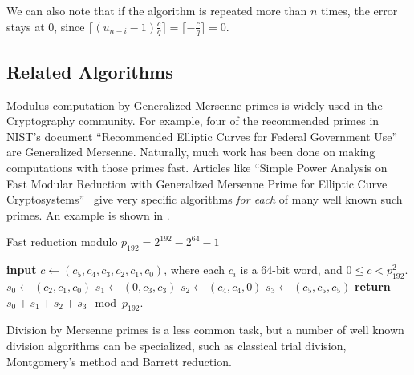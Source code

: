 We can also note that if the algorithm is repeated more than $n$ times, the error stays at 0, since 
$\lceil (u_{n-i}-1)\frac{c}{q}\rceil = \lceil -\frac{c}{q}\rceil = 0$.


\subsection{Related Algorithms}

Modulus computation by Generalized Mersenne primes is widely used in the Cryptography community.
For example, four of the recommended primes in NIST's document ``Recommended Elliptic Curves for Federal Government Use''~\cite{nist} are Generalized Mersenne.
Naturally, much work has been done on making computations with those primes fast.
Articles like ``Simple Power Analysis on Fast Modular Reduction with Generalized Mersenne Prime for Elliptic Curve Cryptosystems''~\cite{sakai2006simple}
give very specific algorithms \emph{for each} of many well known such primes.
An example is shown in .

\begin{algorithm}[H]
	\caption{Fast reduction modulo $p_{192} = 2^{192} - 2^{64} - 1$}
	\label{alg:solina}
	\begin{algorithmic}
		\State \textbf{input} $c \gets (c_5, c_4, c_3, c_2, c_1, c_0)$, where each $c_i$ is a 64-bit word, and $0 \le c < p^2_{192}$.
		\State $s_0 \gets (c_2, c_1, c_0)$
		\State $s_1 \gets (0, c_3, c_3)$
		\State $s_2 \gets (c_4, c_4, 0)$
		\State $s_3 \gets (c_5, c_5, c_5)$
		\State \textbf{return} $s_0 + s_1 + s_2 + s_3 \mod p_{192}$.
	\end{algorithmic}
\end{algorithm}

Division by Mersenne primes is a less common task, but a number of well known division algorithms can be specialized, such as
classical trial division, Montgomery's method and Barrett reduction.




